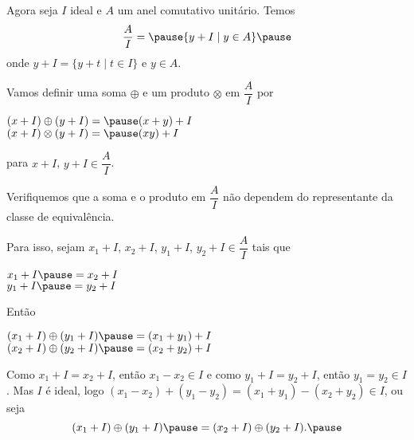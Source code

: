 \documentclass{beamer}
\begin{document}
    \begin{frame}
        Agora seja $I$ ideal \pause e $A$ um anel comutativo unitário. \pause Temos\pause
        \[
            \dfrac{A}{I} = \pause \{y + I \mid y \in A\}\pause
        \]
        onde $y + I = \{y + t \mid t \in I\}$ \pause e $y \in A$.\pause

        Vamos definir uma soma $\oplus$ \pause e um produto $\otimes$ \pause em $\dfrac{A}{I}$ por\pause
        \begin{center}
            $(x + I) \oplus (y + I) = \pause (x + y) + I$\pause\\
            $(x + I) \otimes (y + I) = \pause (xy) + I$\pause
        \end{center}
        para $x + I$, \pause $y + I \in \dfrac{A}{I}$.\pause
    \end{frame}

    \begin{frame}
        Verifiquemos que a soma \pause e o produto \pause em $\dfrac{A}{I}$ \pause n{\~a}o dependem do representante da classe de equival{\^e}ncia.\pause

        Para isso, \pause sejam $x_1 + I$, \pause $x_2 + I$, \pause $y_1 + I$, \pause $y_2 + I \in \dfrac{A}{I}$ \pause tais que\pause
        \begin{center}
            $x_1 + I \pause = x_2 + I$\pause\\
            $y_1 + I \pause = y_2 + I$\pause
        \end{center}

        Ent{\~a}o\pause
        \begin{center}
            $(x_1 + I) \oplus (y_1 + I) \pause = (x_1 + y_1) + I$\pause\\
            $(x_2 + I) \oplus (y_2 + I) \pause = (x_2 + y_2) + I$\pause
        \end{center}
    \end{frame}

    \begin{frame}
        Como $x_1 + I = x_2 + I$, \pause ent{\~a}o $x_1 - x_2 \in I$ \pause e como $y_1 + I = y_2 + I$, \pause ent{\~a}o $y_1 = y_2 \in I$. \pause Mas $I$ {\'e} ideal, \pause logo $(x_1 - x_2) + (y_1 - y_2) = (x_1 + y_1) - (x_2 + y_2) \in I$, \pause ou seja\pause
        \[
            (x_1 + I) \oplus (y_1 + I) \pause = (x_2 + I) \oplus (y_2 + I).\pause
        \]
    \end{frame}
\end{document}
